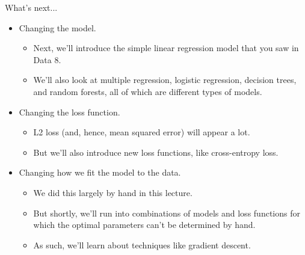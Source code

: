 \documentclass[aspectratio=169]{../latex_main/tntbeamer}  %
\begin{document}
	
	\begin{frame}{What’s next...}
	    \begin{itemize}
	        \item Changing the model.
	        \begin{itemize}
	            \item Next, we’ll introduce the simple linear regression model that you saw in Data 8.
	            \item We’ll also look at multiple regression, logistic regression, decision trees, and random forests, all of which are different types of models.
	        \end{itemize}
            \item Changing the loss function.
	        \begin{itemize}
                \item L2 loss (and, hence, mean squared error) will appear a lot.
	            \item But we’ll also introduce new loss functions, like cross-entropy loss.
	        \end{itemize}
	        \item Changing how we fit the model to the data.
	        \begin{itemize}
	            \item We did this largely by hand in this lecture.
	            \item But shortly, we’ll run into combinations of models and loss functions for which the optimal parameters can’t be determined by hand.
	            \item As such, we’ll learn about techniques like gradient descent.
	        \end{itemize}
	    \end{itemize}
	    
	\end{frame}
\end{document}
